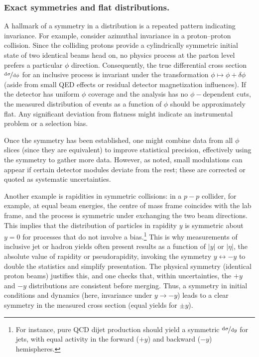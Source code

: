         \subsubsection{Exact symmetries and flat distributions.}
            A hallmark of a symmetry in a distribution is a repeated pattern indicating invariance.
            For example, consider azimuthal invariance in a proton--proton collision.
            Since the colliding protons provide a cylindrically symmetric initial state of two identical beams head on, no physics process at the parton level prefers a particular $\phi$ direction.
            Consequently, the true differential cross section $\nicefrac{\dd\sigma}{\dd\phi}$ for an inclusive process is invariant under the transformation $\phi\mapsto\phi+\delta\phi$ (aside from small QED effects or residual detector magnetization influences).
            If the detector has uniform $\phi$ coverage and the analysis has no $\phi-$dependent cuts, the measured distribution of events as a function of $\phi$ should be approximately flat.
            Any significant deviation from flatness might indicate an instrumental problem or a selection bias.
            
            Once the symmetry has been established, one might combine data from all $\phi$ slices (since they are equivalent) to improve statistical precision, effectively using the symmetry to gather more data.
            However, as noted, small modulations can appear if certain detector modules deviate from the rest; these are corrected or quoted as systematic uncertainties.

            Another example is rapidities in symmetric collisions: in a $p-p$ collider, for example, at equal beam energies, the centre of mass frame coincides with the lab frame, and the process is symmetric under exchanging the two beam directions.
            This implies that the distribution of particles in rapidity $y$ is symmetric about $y=0$ for processes that do not involve a bias.\footnote{For instance, pure QCD dijet production should yield a symmetric $\nicefrac{\dd\sigma}{\dd y}$ for jets, with equal activity in the forward ($+y$) and backward ($-y$) hemispheres.}
            This is why measurements of inclusive jet or hadron yields often present results as a function of $|y|$ or $|\eta|$, the absolute value of rapidity or pseudorapidity, invoking the symmetry $y \leftrightarrow -y$ to double the statistics and simplify presentation.
            The physical symmetry (identical proton beams) justifies this, and one checks that, within uncertainties, the $+y$ and $-y$ distributions are consistent before merging.
            Thus, a symmetry in initial conditions and dynamics (here, invariance under $y\to -y$) leads to a clear symmetry in the measured cross section (equal yields for $\pm y$).

